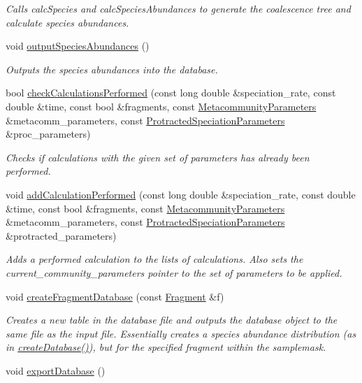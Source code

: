 \begin{DoxyCompactItemize}
\begin{DoxyCompactList}\small\item\em Calls calc\+Species and calc\+Species\+Abundances to generate the coalescence tree and calculate species abundances. \end{DoxyCompactList}\item 
void \hyperlink{class_community_a8cb8044c6b2e290e7933cbc78d7019be}{output\+Species\+Abundances} ()\hypertarget{class_community_a8cb8044c6b2e290e7933cbc78d7019be}{}\label{class_community_a8cb8044c6b2e290e7933cbc78d7019be}

\begin{DoxyCompactList}\small\item\em Outputs the species abundances into the database. \end{DoxyCompactList}\item 
bool \hyperlink{class_community_a95b7d99b7a605674b20944763b7d0da9}{check\+Calculations\+Performed} (const long double \&speciation\+\_\+rate, const double \&time, const bool \&fragments, const \hyperlink{struct_metacommunity_parameters}{Metacommunity\+Parameters} \&metacomm\+\_\+parameters, const \hyperlink{struct_protracted_speciation_parameters}{Protracted\+Speciation\+Parameters} \&proc\+\_\+parameters)
\begin{DoxyCompactList}\small\item\em Checks if calculations with the given set of parameters has already been performed. \end{DoxyCompactList}\item 
void \hyperlink{class_community_a5afd25fd3efd0a131317a2df151a3d8e}{add\+Calculation\+Performed} (const long double \&speciation\+\_\+rate, const double \&time, const bool \&fragments, const \hyperlink{struct_metacommunity_parameters}{Metacommunity\+Parameters} \&metacomm\+\_\+parameters, const \hyperlink{struct_protracted_speciation_parameters}{Protracted\+Speciation\+Parameters} \&protracted\+\_\+parameters)
\begin{DoxyCompactList}\small\item\em Adds a performed calculation to the lists of calculations. Also sets the current\+\_\+community\+\_\+parameters pointer to the set of parameters to be applied. \end{DoxyCompactList}\item 
void \hyperlink{class_community_ad6515ff43ea8189a1acdcccfe893bbba}{create\+Fragment\+Database} (const \hyperlink{struct_fragment}{Fragment} \&f)
\begin{DoxyCompactList}\small\item\em Creates a new table in the database file and outputs the database object to the same file as the input file. Essentially creates a species abundance distribution (as in \hyperlink{class_community_ad6e92dafaf00fd65cc29ca436dc61a2e}{create\+Database()}), but for the specified fragment within the samplemask. \end{DoxyCompactList}\item 
void \hyperlink{class_community_a280850bd6077692755cc419028aa5d67}{export\+Database} ()\hypertarget{class_community_a280850bd6077692755cc419028aa5d67}{}\label{class_community_a280850bd6077692755cc419028aa5d67}


\end{DoxyCompactItemize}
